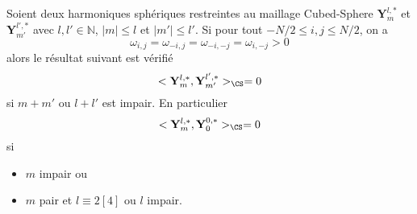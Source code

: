 \begin{theoreme}
Soient deux harmoniques sphériques restreintes au maillage Cubed-Sphere $\mathbf{Y}_m^{l,*}$ et $\mathbf{Y}_{m'}^{l',*}$ avec $l, l' \in \mathbb{N}$, $|m| \leq l$ et $|m'| \leq l'$. Si pour tout $-N/2 \leq i,j \leq N/2$, on a
\begin{equation}
\omega_{i,j} = \omega_{-i,j} = \omega_{-i,-j} = \omega_{i,-j}>0
\label{eq:sym_omega}
\end{equation}
alors le résultat suivant est vérifié
\begin{equation}
<\mathbf{Y}_{m}^{l,*},\mathbf{Y}_{m'}^{l',*}>_{\CS} = 0 
\end{equation}
si $m+m'$ ou $l+l'$ est impair.
En particulier
\begin{equation}
<\mathbf{Y}_{m}^{l,*},\mathbf{Y}_{0}^{0,*}>_{\CS} = 0 
\end{equation}
si 
\begin{itemize}
\item $m$ impair ou
\item $m$ pair et $l \equiv 2 [4]$ ou $l$ impair.
\end{itemize}
\label{th:pdtscal_HS}
\end{theoreme}

